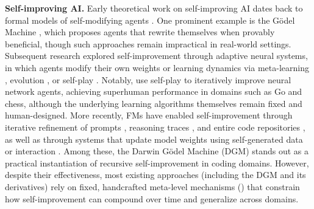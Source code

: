 \documentclass{article}
\begin{document}
\textbf{Self-improving AI.}
Early theoretical work on self-improving AI dates back to formal models of self-modifying agents \citep{hutter2003gentle}. One prominent example is the G\"odel Machine \citep{schmidhuber2003godel}, which proposes agents that rewrite themselves when provably beneficial, though such approaches remain impractical in real-world settings. Subsequent research explored self-improvement through adaptive neural systems, in which agents modify their own weights or learning dynamics via meta-learning \citep{schmidhuber1993neural, miconi2018differentiable, javed2019meta, beaulieu2020learning, miconi2020backpropamine, irie2022modern, chalvidal2022meta, oh2025discovering}, evolution \citep{stanley2002evolving, lange2023discovering, qiu2025evolution, zhao2025automated}, or self-play \citep{silver2016mastering, silver2017mastering, xia2025agent0, xia2026skillrl}. Notably, \citet{silver2017mastering} use self-play to iteratively improve neural network agents, achieving superhuman performance in domains such as Go and chess, although the underlying learning algorithms themselves remain fixed and human-designed. More recently, FMs have enabled self-improvement through iterative refinement of prompts \citep{fernando2023promptbreeder, wang2025evolving, zhang2025agentic, zhang2025recursive, ye2026meta}, reasoning traces \citep{zelikman2022star, yin2025godel, havrilla2024teaching, zhuge2024gptswarm}, and entire code repositories \citep{zhang2025darwin, wang2025huxley, xia2025live}, as well as through systems that update model weights using self-generated data or interaction \citep{wu2024copilot, zweiger2025self, wen2025unsupervised, wei2025toward}. Among these, the Darwin G\"odel Machine (DGM) \citep{zhang2025darwin} stands out as a practical instantiation of recursive self-improvement in coding domains. However, despite their effectiveness, most existing approaches (including the DGM and its derivatives) rely on fixed, handcrafted meta-level mechanisms () that constrain how self-improvement can compound over time and generalize across domains.
\end{document}
